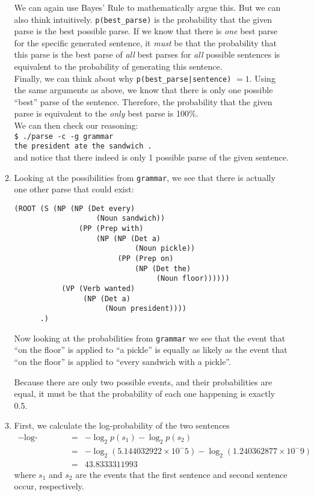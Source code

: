 \documentclass[11pt]{article}
\newcommand{\code}[1]{\texttt{#1}}
\newcommand{\codebox}[1]{\colorbox{codegray}{\texttt{#1}}}
\begin{document}
\begin{enumerate}
\begin{enumerate}[label=(\roman*)]
		We can again use Bayes' Rule to mathematically argue this. But we can also think intuitively. \code{p(best\_parse)} is the probability that the given parse is the best possible parse. If we know that there is \textit{one} best parse for the specific generated sentence, it \textit{must} be that the probability that this parse is the best parse of \textit{all} best parses for \textit{all} possible sentences is equivalent to the probability of generating this sentence. \vspace{4pt} \\
		Finally, we can think about why \code{p(best\_parse|sentence)} $= 1$. 
		Using the same arguments as above, we know that there is only one possible ``best'' parse of the sentence. Therefore, the probability that the given parse is equivalent to the \textit{only} best parse is 100\%. \vspace{4pt} \\
		We can then check our reasoning: \vspace{4pt} \\
		\codebox{\$ ./parse -c -g grammar \text{ }\text{ }\text{ }\text{ }\text{ }\text{ }\text{ }\text{ }} \\
		\codebox{the president ate the sandwich .} \vspace{4pt} \\
		and notice that there indeed is only 1 possible parse of the given sentence.
		
		\newpage
	\item
		Looking at the possibilities from \code{grammar}, we see that there is actually one other parse that could exist:
		\begin{lstlisting}
(ROOT (S (NP (NP (Det every)
                   (Noun sandwich))
               (PP (Prep with)
                   (NP (NP (Det a)
                            (Noun pickle))
                        (PP (Prep on)
                            (NP (Det the)
                                 (Noun floor))))))
           (VP (Verb wanted)
                (NP (Det a)
                     (Noun president))))
      .)
		\end{lstlisting}
		Now looking at the probabilities from \code{grammar} we see that the event that ``on the floor'' is applied to ``a pickle'' is equally as likely as the event that ``on the floor'' is applied to ``every sandwich with a pickle''.
		
		Because there are only two possible events, and their probabilities are equal, it must be that the probability of each one happening is exactly 0.5.
		\item
			First, we calculate the log-probability of the two sentences
			\begin{eqnarray*}
				- \text{log-probability} &=& - \log_2 p(s_1) - \log_2 p(s_2) \\
					&=& - \log_2 \left(5.144032922 \times 10^-5 \right) - \log_2 \left(1.240362877 \times 10^-9 \right) \\
                    &=& 43.8333311993
			\end{eqnarray*}
			where $s_1$ and $s_2$ are the events that the first sentence and second sentence occur, respectively.
			

\end{enumerate}
\end{enumerate}
\end{document}
